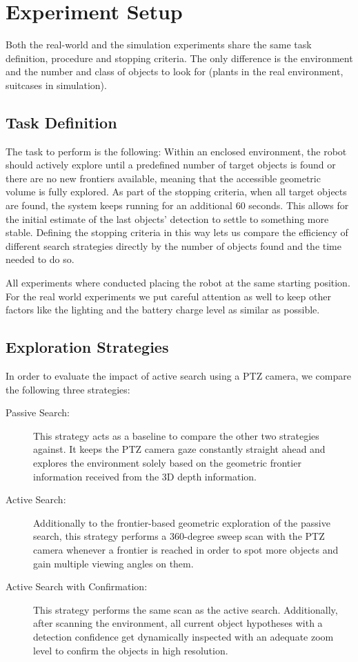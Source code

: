 \documentclass[
	parspace, %
	noindent, %
	final, %
]{elteikthesis}
\begin{document}
\section{Experiment Setup}
Both the real-world and the simulation experiments share the same task definition, procedure and stopping criteria. The only difference is the environment and the number and class of objects to look for (plants in the real environment, suitcases in simulation).

\subsection{Task Definition}
The task to perform is the following: Within an enclosed environment, the robot should actively explore until a predefined number of target objects is found or there are no new frontiers available, meaning that the accessible geometric volume is fully explored. As part of the stopping criteria, when all target objects are found, the system keeps running for an additional 60 seconds. This allows for the initial estimate of the last objects' detection to settle to something more stable. Defining the stopping criteria in this way lets us compare the efficiency of different search strategies directly by the number of objects found and the time needed to do so.

All experiments where conducted placing the robot at the same starting position. For the real world experiments we put careful attention as well to keep other factors like the lighting and the battery charge level as similar as possible.

\subsection{Exploration Strategies}
In order to evaluate the impact of active search using a PTZ camera, we compare the following three strategies:

\begin{description}
    \item[Passive Search:] This strategy acts as a baseline to compare the other two strategies against. It keeps the PTZ camera gaze constantly straight ahead and explores the environment solely based on the geometric frontier information received from the 3D depth information.

    \item[Active Search:] Additionally to the frontier-based geometric exploration of the passive search, this strategy performs a 360-degree sweep scan with the PTZ camera whenever a frontier is reached in order to spot more objects and gain multiple viewing angles on them.

    \item[Active Search with Confirmation:] This strategy performs the same scan as the active search. Additionally, after scanning the environment, all current object hypotheses with a detection confidence get dynamically inspected with an adequate zoom level to confirm the objects in high resolution.
\end{description}
\end{document}
